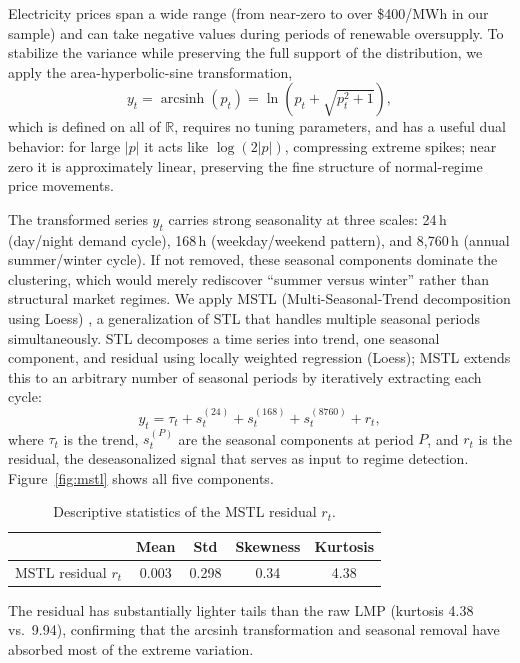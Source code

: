 \documentclass[12pt]{article}
\newcommand{\arcsinh}{\operatorname{arcsinh}}
\begin{document}
Electricity prices span a wide range (from near-zero to over \$400/MWh in our sample) and can take negative values during periods of renewable oversupply.
To stabilize the variance while preserving the full support of the distribution, we apply the area-hyperbolic-sine transformation,
\begin{equation}
y_t = \arcsinh(p_t) = \ln\!\left(p_t + \sqrt{p_t^2 + 1}\right),
\label{eq:arcsinh}
\end{equation}
which is defined on all of $\mathbb{R}$, requires no tuning parameters, and has a useful dual behavior: for large $|p|$ it acts like $\log(2|p|)$, compressing extreme spikes; near zero it is approximately linear, preserving the fine structure of normal-regime price movements.

The transformed series $y_t$ carries strong seasonality at three scales: 24\,h (day/night demand cycle), 168\,h (weekday/weekend pattern), and 8,760\,h (annual summer/winter cycle).
If not removed, these seasonal components dominate the clustering, which would merely rediscover ``summer versus winter'' rather than structural market regimes.
We apply MSTL (Multi-Seasonal-Trend decomposition using Loess) \citep{bandara2021}, a generalization of STL \citep{cleveland1990} that handles multiple seasonal periods simultaneously.
STL decomposes a time series into trend, one seasonal component, and residual using locally weighted regression (Loess); MSTL extends this to an arbitrary number of seasonal periods by iteratively extracting each cycle:
\begin{equation}
y_t = \tau_t + s_t^{(24)} + s_t^{(168)} + s_t^{(8760)} + r_t,
\label{eq:mstl}
\end{equation}
where $\tau_t$ is the trend, $s_t^{(P)}$ are the seasonal components at period $P$, and $r_t$ is the residual, the deseasonalized signal that serves as input to regime detection.
Figure~\ref{fig:mstl} shows all five components.

\begin{table}[H]
\centering
\caption{Descriptive statistics of the MSTL residual $r_t$.}
\label{tab:residual_stats}
\begin{tabular}{lcccc}
\toprule
& Mean & Std & Skewness & Kurtosis \\
\midrule
MSTL residual $r_t$ & 0.003 & 0.298 & 0.34 & 4.38 \\
\bottomrule
\end{tabular}
\end{table}

\noindent The residual has substantially lighter tails than the raw LMP (kurtosis 4.38 vs.\ 9.94), confirming that the arcsinh transformation and seasonal removal have absorbed most of the extreme variation.
\end{document}
